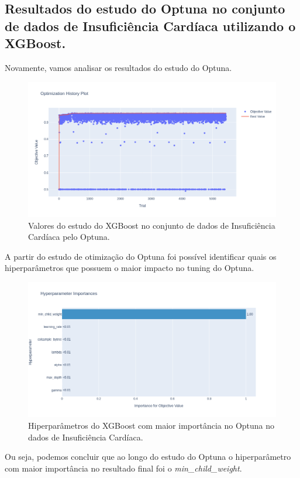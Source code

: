 \subsection{Resultados do estudo do Optuna no conjunto de dados de Insuficiência Cardíaca utilizando o XGBoost.}
Novamente, vamos analisar os resultados do estudo do Optuna.
\begin{figure}[H]
 \caption{Valores do estudo do XGBoost no conjunto de dados de Insuficiência Cardíaca pelo Optuna.}
 \label{fig:op:heart:trials:xgb}
 \centering
 \includegraphics[scale=0.4]{images/optuna_xgboost_heart.png}
\end{figure}
A partir do estudo de otimização do Optuna foi possível identificar quais os hiperparâmetros que possuem o maior impacto no tuning do Optuna.
\begin{figure}[H]
 \caption{Hiperparâmetros do XGBoost com maior importância no Optuna no dados de Insuficiência Cardíaca.}
 \label{fig:op:heart:impo:xgb}
 \centering
 \includegraphics[scale=0.4]{images/optuna_xgboost_importance_heart.png}
\end{figure}
Ou seja, podemos concluir que ao longo do estudo do Optuna o hiperparâmetro com maior importância no resultado final foi o \textit{min\_child\_weight}.

